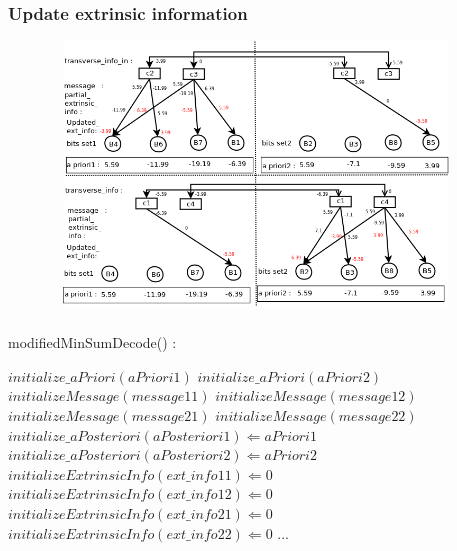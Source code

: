 \documentclass[xcolor=dvipsname]
{beamer}
\begin{document}
\begin{frame}[t]
\frametitle{ Update extrinsic information }  
\vspace{-5mm}
\begin{figure}
       \includegraphics[height=7cm,width=11cm]{minSumModified4}
       \end{figure}
\end{frame}

\begin{frame}[t]
\frametitle{  }                                 %
\alert{ modifiedMinSumDecode()	: }
\begin{algorithmic}                   
    \STATE $initialize\_aPriori(aPriori1) $
    \STATE $initialize\_aPriori(aPriori2) $
    \STATE $initializeMessage(message11) $
    \STATE $initializeMessage(message12) $
    \STATE $initializeMessage(message21) $
    \STATE $initializeMessage(message22) $
    	\STATE$ initialize\_aPosteriori(aPosteriori1) \Leftarrow aPriori1 $
    	\STATE$ initialize\_aPosteriori(aPosteriori2) \Leftarrow aPriori2 $
   		\STATE $initializeExtrinsicInfo(ext\_info11) \Leftarrow 0 $
   		\STATE $initializeExtrinsicInfo(ext\_info12) \Leftarrow 0 $
   		\STATE $initializeExtrinsicInfo(ext\_info21) \Leftarrow 0 $
   		\STATE $initializeExtrinsicInfo(ext\_info22) \Leftarrow 0 $
   		\STATE ... 		
   		 \ENDWHILE 
\end{algorithmic}
\end{frame}
\end{document}
